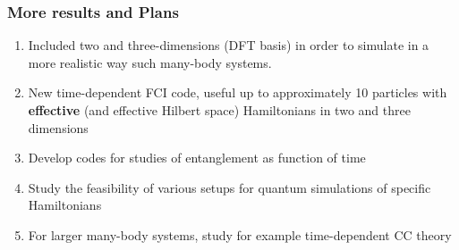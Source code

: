 \documentclass{beamer}
\begin{document}
\begin{frame}
\frametitle{More results and Plans}

\begin{enumerate}
\item Included  two and three-dimensions (DFT basis) in order to simulate in  a more realistic way such many-body systems.

\item New time-dependent FCI code, useful up to approximately 10 particles with \textbf{effective} (and effective Hilbert space) Hamiltonians in two and three dimensions

\item Develop codes for studies of entanglement as function of time


\item Study the feasibility of various setups for quantum simulations of specific Hamiltonians

\item For larger many-body systems, study for example time-dependent CC theory
\end{enumerate}

\noindent
\end{frame}
\end{document}

